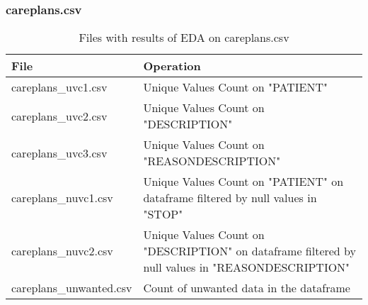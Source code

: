 \documentclass[12pt, twosided]{report}  %
\begin{document}
\subsubsection{careplans.csv}

\begin{table}[H]
	\centering
	\begin{tabular}{p{4.5cm}|p{15cm}}
		\textbf{File}                & \textbf{Operation} \\ \hline
		careplans\_uvc1.csv & Unique Values Count on "PATIENT"   \\
		careplans\_uvc2.csv & Unique Values Count on "DESCRIPTION"  \\
		careplans\_uvc3.csv    & Unique Values Count on "REASONDESCRIPTION"   \\
		careplans\_nuvc1.csv    & Unique Values Count on "PATIENT" on dataframe filtered by null values in "STOP" \\
		careplans\_nuvc2.csv    & Unique Values Count on "DESCRIPTION" on dataframe filtered by null values in "REASONDESCRIPTION"  \\
		careplans\_unwanted.csv & Count of unwanted data in the dataframe  \\
	\end{tabular}
	\caption{Files with results of EDA on careplans.csv}
\end{table}
\end{document}
